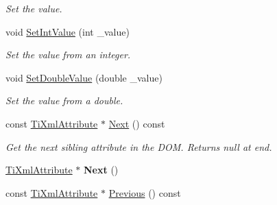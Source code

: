 \begin{DoxyCompactItemize}
\begin{DoxyCompactList}\small\item\em \-Set the value. \end{DoxyCompactList}\item 
\hypertarget{classTiXmlAttribute_a7e065df640116a62ea4f4b7da5449cc8}{
void \hyperlink{classTiXmlAttribute_a7e065df640116a62ea4f4b7da5449cc8}{\-Set\-Int\-Value} (int \-\_\-value)}
\label{d4/dc1/classTiXmlAttribute_a7e065df640116a62ea4f4b7da5449cc8}

\begin{DoxyCompactList}\small\item\em \-Set the value from an integer. \end{DoxyCompactList}\item 
\hypertarget{classTiXmlAttribute_a0316da31373496c4368ad549bf711394}{
void \hyperlink{classTiXmlAttribute_a0316da31373496c4368ad549bf711394}{\-Set\-Double\-Value} (double \-\_\-value)}
\label{d4/dc1/classTiXmlAttribute_a0316da31373496c4368ad549bf711394}

\begin{DoxyCompactList}\small\item\em \-Set the value from a double. \end{DoxyCompactList}\item 
\hypertarget{classTiXmlAttribute_a776478980776a024f7c2846eec640f65}{
const \hyperlink{classTiXmlAttribute}{\-Ti\-Xml\-Attribute} $\ast$ \hyperlink{classTiXmlAttribute_a776478980776a024f7c2846eec640f65}{\-Next} () const }
\label{d4/dc1/classTiXmlAttribute_a776478980776a024f7c2846eec640f65}

\begin{DoxyCompactList}\small\item\em \-Get the next sibling attribute in the \-D\-O\-M. \-Returns null at end. \end{DoxyCompactList}\item 
\hypertarget{classTiXmlAttribute_a138320aa7793b148ba7e5bd0a0ea4db6}{
\hyperlink{classTiXmlAttribute}{\-Ti\-Xml\-Attribute} $\ast$ {\bfseries \-Next} ()}
\label{d4/dc1/classTiXmlAttribute_a138320aa7793b148ba7e5bd0a0ea4db6}

\item 
\hypertarget{classTiXmlAttribute_a54a5f8730c7b02b9a41b74e12e27fe86}{
const \hyperlink{classTiXmlAttribute}{\-Ti\-Xml\-Attribute} $\ast$ \hyperlink{classTiXmlAttribute_a54a5f8730c7b02b9a41b74e12e27fe86}{\-Previous} () const }
\label{d4/dc1/classTiXmlAttribute_a54a5f8730c7b02b9a41b74e12e27fe86}


\end{DoxyCompactItemize}
